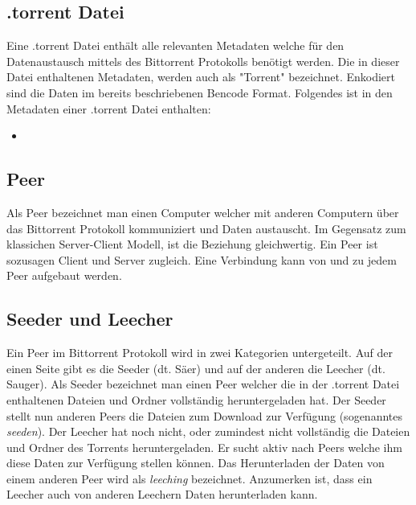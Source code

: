 \subsection{.torrent Datei}
Eine .torrent Datei enthält alle relevanten Metadaten welche für den Datenaustausch mittels des Bittorrent Protokolls benötigt werden. Die in dieser Datei enthaltenen Metadaten, werden auch als "Torrent" bezeichnet. Enkodiert sind die Daten im bereits beschriebenen Bencode Format. Folgendes ist in den Metadaten einer .torrent Datei enthalten:

\begin{itemize}
    \item 
\end{itemize}

\subsection{Peer}
Als Peer bezeichnet man einen Computer welcher mit anderen Computern über das Bittorrent Protokoll kommuniziert und Daten austauscht. Im Gegensatz zum klassichen Server-Client Modell, ist die Beziehung gleichwertig. Ein Peer ist sozusagen Client und Server zugleich. Eine Verbindung kann von und zu jedem Peer aufgebaut werden. 

\subsection{Seeder und Leecher}
Ein Peer im Bittorrent Protokoll wird in zwei Kategorien untergeteilt. Auf der einen Seite gibt es die Seeder (dt. Säer) und auf der anderen die Leecher (dt. Sauger). 
Als Seeder bezeichnet man einen Peer welcher die in der .torrent Datei enthaltenen Dateien und Ordner vollständig heruntergeladen hat. Der Seeder stellt nun anderen Peers die Dateien zum Download zur Verfügung  (sogenanntes \emph{seeden}).  
Der Leecher hat noch nicht, oder zumindest nicht vollständig die Dateien und Ordner des Torrents heruntergeladen. Er sucht aktiv nach Peers welche ihm diese Daten zur Verfügung stellen können. Das Herunterladen der Daten von einem anderen Peer wird als \emph{leeching} bezeichnet. Anzumerken ist, dass ein Leecher auch von anderen Leechern Daten herunterladen kann. 

